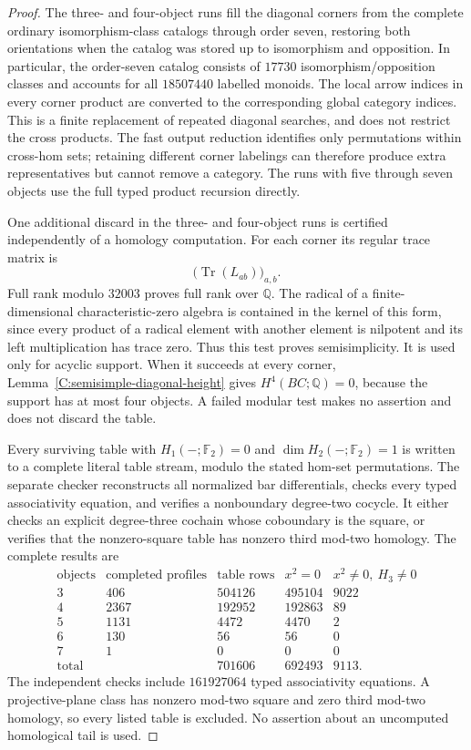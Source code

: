 \begin{proof}
The three- and four-object runs fill the diagonal corners from
the complete ordinary isomorphism-class catalogs through order
seven, restoring both orientations when the catalog was stored
up to isomorphism and opposition.  In particular, the order-seven
catalog consists of $17730$ isomorphism/opposition classes and
accounts for all $18507440$ labelled monoids.  The local arrow
indices in every corner product are converted to the corresponding
global category indices.  This is a finite replacement of repeated
diagonal searches, and does not restrict the cross products.
The fast output reduction identifies only permutations within
cross-hom sets; retaining different corner labelings can therefore
produce extra representatives but cannot remove a category.
The runs with five through seven objects use the full typed
product recursion directly.

One additional discard in the three- and four-object runs is
certified independently of a homology computation.  For each
corner its regular trace matrix is
\[
 \bigl(\operatorname{Tr}(L_{ab})\bigr)_{a,b}.
\]
Full rank modulo $32003$ proves full rank over $\mathbb Q$.
The radical of a finite-dimensional characteristic-zero algebra
is contained in the kernel of this form, since every product
of a radical element with another element is nilpotent and its
left multiplication has trace zero.  Thus this test proves
semisimplicity.  It is used only for acyclic support.  When it
succeeds at every corner, Lemma~\ref{C:semisimple-diagonal-height}
gives $H^4(BC;\mathbb Q)=0$, because the support has at most
four objects.  A failed modular test makes no assertion and
does not discard the table.

Every surviving table with $H_1(-;\mathbb F_2)=0$ and
$\dim H_2(-;\mathbb F_2)=1$ is written to a complete literal
table stream, modulo the stated hom-set permutations.  The
separate checker reconstructs all normalized bar differentials,
checks every typed associativity equation, and verifies a
nonboundary degree-two cocycle.  It either checks an explicit
degree-three cochain whose coboundary is the square, or verifies
that the nonzero-square table has nonzero third mod-two homology.
The complete results are
\[
\begin{array}{c|r|r|r|r}
\text{objects}&\text{completed profiles}&\text{table rows}
 &x^2=0&x^2\ne0,\ H_3\ne0\\\hline
3&406&504126&495104&9022\\
4&2367&192952&192863&89\\
5&1131&4472&4470&2\\
6&130&56&56&0\\
7&1&0&0&0\\\hline
\text{total}&&701606&692493&9113.
\end{array}
\]
The independent checks include $161927064$ typed associativity
equations.  A projective-plane class has nonzero mod-two square
and zero third mod-two homology, so every listed table is excluded.
No assertion about an uncomputed homological tail is used.


\end{proof}
